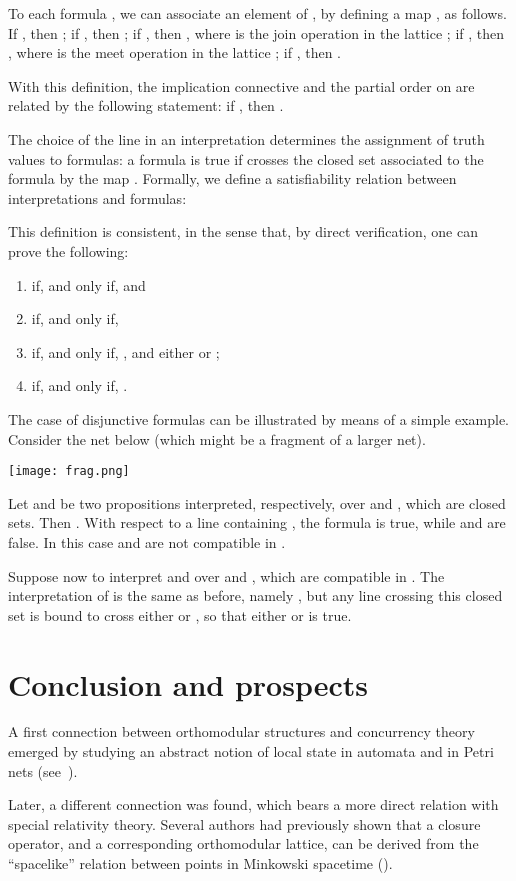 \documentclass{eptcs}
\begin{document}
To each formula , we can associate an element of ,
by defining a map , as follows.
If , then ; if , then
;
if , then , where
 is the join operation in the lattice ;
if , then , where
 is the meet operation in the lattice ;
if , then
.

With this definition, the implication connective and the
partial order on  are related by the following
statement: if , then
.

The choice of the line  in an interpretation
determines the assignment of
truth values to formulas: a formula is true if 
crosses the closed set associated to the formula by the
map .
Formally, we define a satisfiability relation between interpretations
and formulas:

This definition is consistent, in the sense that, by direct
verification, one can prove the following:
\begin{enumerate}
  \item  if, and only if, 
        and 
  \item  if, and only if,
        
  \item  if, and only if,
        , and either  or ;
  \item  if, and only if,
        .
\end{enumerate}
The case of disjunctive formulas can be illustrated by means
of a simple example. Consider the net below
(which might be a fragment of a larger net).
\begin{center}
  \texttt{[image: frag.png]}
\end{center}
Let  and  be two propositions interpreted,
respectively, over  and , which are
closed sets. Then
. With respect to a line
 containing , the formula  is true,
while  and  are false. In this
case  and  are not compatible in .

Suppose now to interpret  and  over  and ,
which are compatible in . The interpretation of 
is the same as before, namely , but any
line crossing this closed set is bound to cross either
 or , so that either  or  is true.
\section{Conclusion and prospects}
A first connection between orthomodular structures
and concurrency theory emerged by studying an
abstract notion of local state in automata and in
Petri nets (see~\cite{BFP03}).

Later, a different connection was found, which bears a more
direct relation with special relativity theory.
Several authors had previously shown that a closure operator, and a
corresponding orthomodular lattice, can be derived from 
the ``spacelike'' relation between points in Minkowski spacetime
(\cite{C02,CJ77}).
\end{document}
